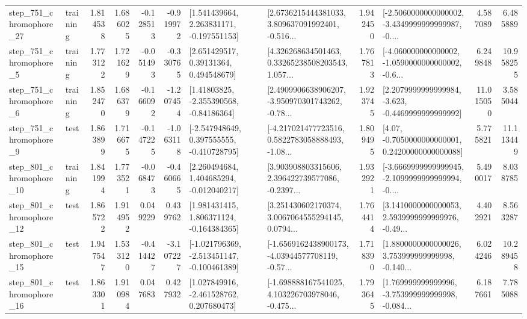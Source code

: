 \begin{tabular}{llrrrrllrlrr}
  step\_751\_chromophore\_27 &  training &      1.814538 &    1.686025 &     -0.128513 & -0.919972 &    [1.541439664, 2.263831171, -0.197551153] &  [2.6736215444381033, 3.809637091992401, -0.516... &       1.942450 &  [-2.5060000000000002, -3.4349999999999987, -0.... &            4.587089 &          6.485889 \\
   step\_751\_chromophore\_5 &  training &      1.773122 &    1.721629 &     -0.051493 & -0.330765 &      [2.651429517, 0.39131364, 0.494548679] &  [4.326268634501463, 0.33265238508203543, 1.057... &       1.767813 &  [-4.060000000000002, -1.0590000000000002, -0.6... &            6.249848 &         10.958255 \\
   step\_751\_chromophore\_6 &  training &      1.852470 &    1.686379 &     -0.166092 & -1.207454 &     [1.41803825, -2.355390568, -0.84186364] &  [2.4909906638906207, -3.950970301743262, -0.78... &       1.923745 &  [2.2079999999999984, -3.623, -0.4469999999999992] &           11.015050 &          3.585044 \\
   step\_751\_chromophore\_9 &      test &      1.863899 &    1.716675 &     -0.147225 & -1.063118 &   [-2.547948649, 0.397555555, -0.410728795] &  [-4.217021477723516, 0.5822783058888493, -1.08... &       1.809495 &   [4.07, -0.7050000000000001, 0.24200000000000088] &            5.775821 &         11.113449 \\
  step\_801\_chromophore\_10 &  training &      1.841994 &    1.773521 &     -0.068473 & -0.460665 &    [2.260494684, 1.404685294, -0.012040217] &  [3.903908803315606, 2.396422739577086, -0.2397... &       1.932921 &  [-3.6669999999999945, -2.1099999999999994, -0.... &            5.490017 &          8.038785 \\
  step\_801\_chromophore\_12 &      test &      1.865722 &    1.914952 &      0.049229 &  0.439762 &    [1.981431415, 1.806371124, -0.164384365] &  [3.251430602170374, 3.0067064555294145, 0.0794... &       1.764414 &  [3.1410000000000053, 2.5939999999999976, -0.49... &            4.402921 &          8.563287 \\
  step\_801\_chromophore\_15 &      test &      1.947547 &    1.533120 &     -0.414427 & -3.107227 &  [-1.021796369, -2.513451147, -0.100461389] &  [-1.6569162438900173, -4.03944577708119, -0.57... &       1.718390 &  [1.8800000000000026, 3.753999999999998, -0.140... &            6.024246 &         10.289458 \\
  step\_801\_chromophore\_16 &      test &      1.863301 &    1.910984 &      0.047683 &  0.427932 &    [1.027849916, -2.461528762, 0.207680473] &  [-1.698888167541025, 4.103226703978046, -0.475... &       1.793645 &  [1.769999999999996, -3.753999999999998, -0.084... &            6.187661 &          7.785088 \\

\end{tabular}
